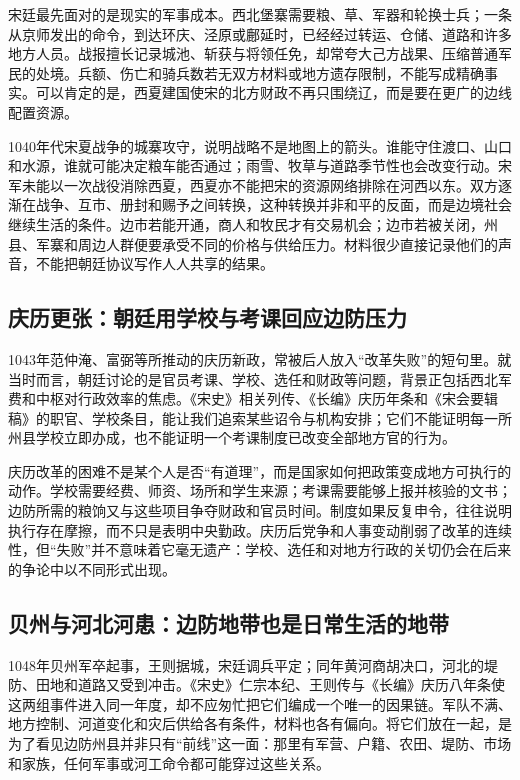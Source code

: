 宋廷最先面对的是现实的军事成本。西北堡寨需要粮、草、军器和轮换士兵；一条从京师发出的命令，到达环庆、泾原或鄜延时，已经经过转运、仓储、道路和许多地方人员。战报擅长记录城池、斩获与将领任免，却常夸大己方战果、压缩普通军民的处境。兵额、伤亡和骑兵数若无双方材料或地方遗存限制，不能写成精确事实。可以肯定的是，西夏建国使宋的北方财政不再只围绕辽，而是要在更广的边线配置资源。

1040年代宋夏战争的城寨攻守，说明战略不是地图上的箭头。谁能守住渡口、山口和水源，谁就可能决定粮车能否通过；雨雪、牧草与道路季节性也会改变行动。宋军未能以一次战役消除西夏，西夏亦不能把宋的资源网络排除在河西以东。双方逐渐在战争、互市、册封和赐予之间转换，这种转换并非和平的反面，而是边境社会继续生活的条件。边市若能开通，商人和牧民才有交易机会；边市若被关闭，州县、军寨和周边人群便要承受不同的价格与供给压力。材料很少直接记录他们的声音，不能把朝廷协议写作人人共享的结果。

\subsection{庆历更张：朝廷用学校与考课回应边防压力}

1043年范仲淹、富弼等所推动的庆历新政，常被后人放入“改革失败”的短句里。就当时而言，朝廷讨论的是官员考课、学校、选任和财政等问题，背景正包括西北军费和中枢对行政效率的焦虑。《宋史》相关列传、《长编》庆历年条和《宋会要辑稿》的职官、学校条目，能让我们追索某些诏令与机构安排；它们不能证明每一所州县学校立即办成，也不能证明一个考课制度已改变全部地方官的行为。

庆历改革的困难不是某个人是否“有道理”，而是国家如何把政策变成地方可执行的动作。学校需要经费、师资、场所和学生来源；考课需要能够上报并核验的文书；边防所需的粮饷又与这些项目争夺财政和官员时间。制度如果反复申令，往往说明执行存在摩擦，而不只是表明中央勤政。庆历后党争和人事变动削弱了改革的连续性，但“失败”并不意味着它毫无遗产：学校、选任和对地方行政的关切仍会在后来的争论中以不同形式出现。

\subsection{贝州与河北河患：边防地带也是日常生活的地带}

1048年贝州军卒起事，王则据城，宋廷调兵平定；同年黄河商胡决口，河北的堤防、田地和道路又受到冲击。《宋史》仁宗本纪、王则传与《长编》庆历八年条使这两组事件进入同一年度，却不应匆忙把它们编成一个唯一的因果链。军队不满、地方控制、河道变化和灾后供给各有条件，材料也各有偏向。将它们放在一起，是为了看见边防州县并非只有“前线”这一面：那里有军营、户籍、农田、堤防、市场和家族，任何军事或河工命令都可能穿过这些关系。


